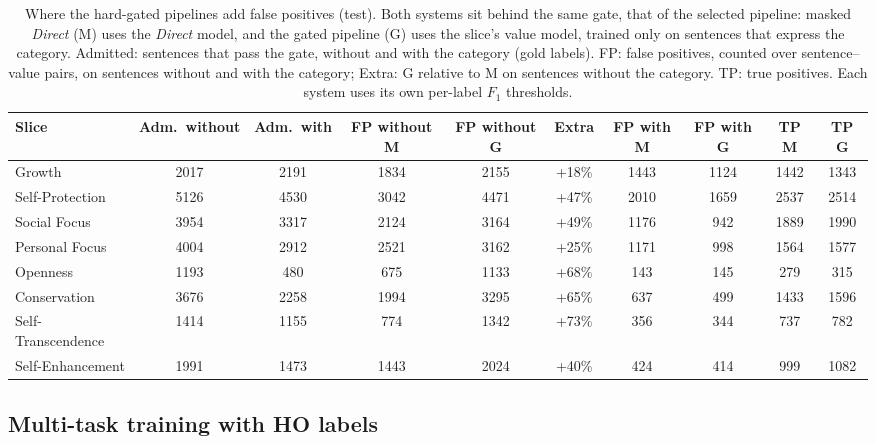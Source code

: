 {\setlength{\tabcolsep}{3pt}
\begin{table}[!htbp]
\centering
\scriptsize
\caption{Where the hard-gated pipelines add false positives (test). Both systems sit behind the same gate, that of the selected pipeline: masked \emph{Direct} (M) uses the \emph{Direct} model, and the gated pipeline (G) uses the slice's value model, trained only on sentences that express the category. Admitted: sentences that pass the gate, without and with the category (gold labels). FP: false positives, counted over sentence--value pairs, on sentences without and with the category; Extra: G relative to M on sentences without the category. TP: true positives. Each system uses its own per-label $F_1$ thresholds.}
\label{tab:s8-gate-fp}
\begin{tabularx}{\textwidth}{lccccccccc}
\hline
\textbf{Slice} & \textbf{Adm.\ without} & \textbf{Adm.\ with} & \textbf{FP without M} & \textbf{FP without G} & \textbf{Extra} & \textbf{FP with M} & \textbf{FP with G} & \textbf{TP M} & \textbf{TP G} \\
\hline
Growth & 2017 & 2191 & 1834 & 2155 & +18\% & 1443 & 1124 & 1442 & 1343 \\
Self-Protection & 5126 & 4530 & 3042 & 4471 & +47\% & 2010 & 1659 & 2537 & 2514 \\
Social Focus & 3954 & 3317 & 2124 & 3164 & +49\% & 1176 & 942 & 1889 & 1990 \\
Personal Focus & 4004 & 2912 & 2521 & 3162 & +25\% & 1171 & 998 & 1564 & 1577 \\
Openness & 1193 & 480 & 675 & 1133 & +68\% & 143 & 145 & 279 & 315 \\
Conservation & 3676 & 2258 & 1994 & 3295 & +65\% & 637 & 499 & 1433 & 1596 \\
Self-Transcendence & 1414 & 1155 & 774 & 1342 & +73\% & 356 & 344 & 737 & 782 \\
Self-Enhancement & 1991 & 1473 & 1443 & 2024 & +40\% & 424 & 414 & 999 & 1082 \\
\hline
\end{tabularx}
\end{table}
}


\subsection{Multi-task training with HO labels}
\label{sec:s8-multitask}

